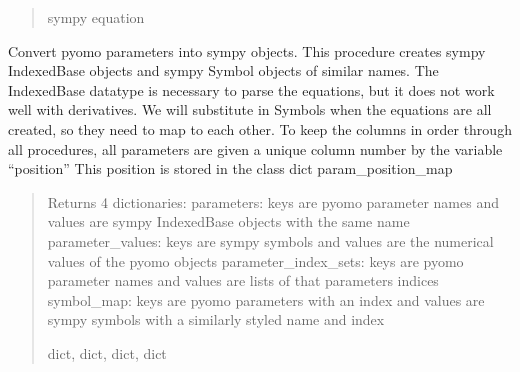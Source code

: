 \documentclass[letterpaper,10pt,english]{sphinxmanual}
\begin{document}
\begin{fulllineitems}
\begin{fulllineitems}
\begin{quote}
\begin{description}
\sphinxAtStartPar
sympy equation

\end{description}\end{quote}

\end{fulllineitems}


\begin{fulllineitems}
\label{\detokenize{src.sensitivity.faster_sensitivity:src.sensitivity.faster_sensitivity.AutoSympy.get_parameters}}
\pysigstartsignatures
\pysiglinewithargsret
{}
{}
{}
\pysigstopsignatures
\sphinxAtStartPar
Convert pyomo parameters into sympy objects.
This procedure creates sympy IndexedBase objects and sympy Symbol objects of similar names.
The IndexedBase datatype is necessary to parse the equations, but it does not work well with derivatives.
We will substitute in Symbols when the equations are all created, so they need to map to each other.
To keep the columns in order through all procedures, all parameters are given a unique column number by the variable “position”
This position is stored in the class dict param\_position\_map
\begin{quote}\begin{description}
\sphinxAtStartPar
Returns 4 dictionaries:
parameters: keys are pyomo parameter names and values are sympy IndexedBase objects with the same name
parameter\_values: keys are sympy symbols and values are the numerical values of the pyomo objects
parameter\_index\_sets: keys are pyomo parameter names and values are lists of that parameters indices
symbol\_map: keys are pyomo parameters with an index and values are sympy symbols with a similarly styled name and index

\sphinxAtStartPar
dict, dict, dict, dict

\end{description}\end{quote}

\end{fulllineitems}



\end{fulllineitems}
\end{document}
